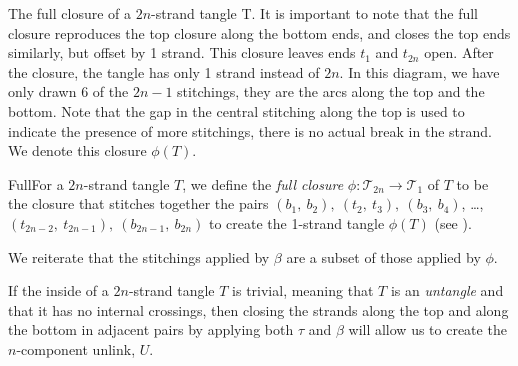 \begin{paper}
{The full closure of a $2n$-strand tangle T.
It is important to note that the full closure reproduces the top closure along
the bottom ends, and closes the top ends similarly, but offset by 1 strand.
This closure leaves ends $t_1$ and $t_{2n}$ open.
After the closure, the tangle has only 1 strand instead of $2n$.
In this diagram, we have only drawn 6 of the $2n-1$ stitchings, they are the
arcs along the top and the bottom.
Note that the gap in the central stitching along the top is used to indicate the
presence of more stitchings, there is no actual break in the strand.
We denote this closure $\phi(T)$.}

\begin{paperdef}{Full}{For a $2n$-strand tangle $T$, we define the
\textit{full closure} $\phi:\mathcal{T}_{2n}\to\mathcal{T}_1$ of $T$ to be the
closure that stitches together the pairs $(b_1,~b_2),~(t_2,~t_3),~(b_3,~b_4)$,
\dots, $(t_{2n-2},~t_{2n-1}),~(b_{2n-1},~b_{2n})$ to create the 1-strand tangle
$\phi(T)$ (see \figFull).}\end{paperdef}

We reiterate that the stitchings applied by $\beta$ are a subset of those
applied by $\phi$.

If the inside of a $2n$-strand tangle $T$ is trivial, meaning that $T$ is an
\textit{untangle} and that it has no internal crossings, then closing the
strands along the top and along the bottom in adjacent pairs by applying both
$\tau$ and $\beta$ will allow us to create the $n$-component unlink, $U$.


\end{paper}
